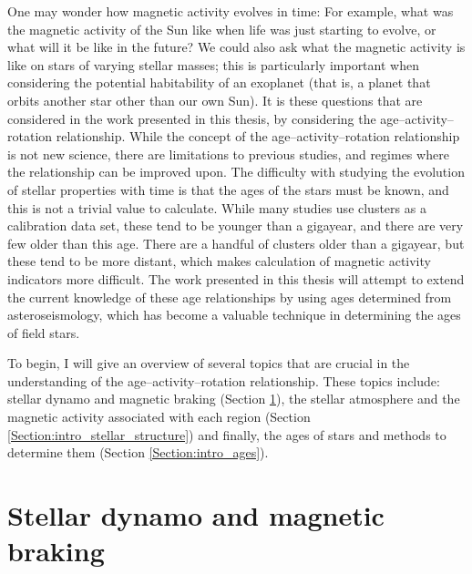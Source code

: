 One may wonder how magnetic activity evolves in time: For example, what was the magnetic activity of the Sun like when life was just starting to evolve, or what will it be like in the future? We could also ask what the magnetic activity is like on stars of varying stellar masses; this is particularly important when considering the potential habitability of an exoplanet (that is, a planet that orbits another star other than our own Sun). It is these questions that are considered in the work presented in this thesis, by considering the age--activity--rotation relationship. While the concept of the age--activity--rotation relationship is not new science, there are limitations to previous studies, and regimes where the relationship can be improved upon. The difficulty with studying the evolution of stellar properties with time is that the ages of the stars must be known, and this is not a trivial value to calculate. While many studies use clusters as a calibration data set, these tend to be younger than a gigayear, and there are very few older than this age. There are a handful of clusters older than a gigayear, but these tend to be more distant, which makes calculation of magnetic activity indicators more difficult. The work presented in this thesis will attempt to extend the current knowledge of these age relationships by using ages determined from asteroseismology, which has become a valuable technique in determining the ages of field stars.

To begin, I will give an overview of several topics that are crucial in the understanding of the age--activity--rotation relationship. These topics include: stellar dynamo and magnetic braking (Section \ref{Section:intro_dynamo_and_braking_section}), the stellar atmosphere and the magnetic activity associated with each region (Section \ref{Section:intro_stellar_structure}) and finally, the ages of stars and methods to determine them (Section \ref{Section:intro_ages}).

\section{Stellar dynamo and magnetic braking}
\label{Section:intro_dynamo_and_braking_section}

